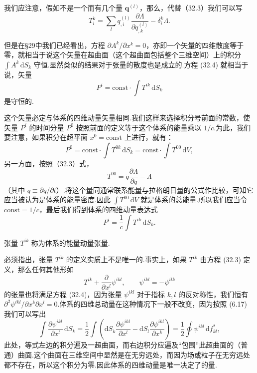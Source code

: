 我们应注意，假如不是一个而有几个量 $\boldsymbol{q}^{(l)}$，那么，代替（32.3）我们可以写
\begin{equation}
  T_i^k=\sum_l q_{,i}^{(l)}
  \frac{\partial\varLambda}{\partial q_{,k}^{(l)}}-\delta_i^k\varLambda.
\end{equation}

但是在§29中我们已经看出，方程 $\partial A^k/\partial x^k=0$，亦即一个矢量的四维散度等于零，就相当于说这个矢量在超曲面（这个超曲面包括整个三维空间）上的积分
$\int A^k\,\mathrm{d}S_k$
守恒.显然类似的结果对于张量的散度也是成立的.方程 (32.4) 就相当于说，矢量
\begin{equation*}
  P^i=\mathrm{const}\cdot\int T^{ik}\,\mathrm{d}S_k
\end{equation*}
是守恒的.

这个矢量必定与体系的四维动量矢量相同.我们这样来选择积分号前面的常数，使矢量 $P^i$ 的时间分量 $P^0$
按照前面的定义等于这个体系的能量乘以 $1/c$.为此，我们要注意，如果积分在超平面
$x^0=\mathrm{const}$ 上进行，就有：
\begin{equation*}
  P^0=\mathrm{const}\cdot\int T^{0k}\,\mathrm{d}S_k
  =\mathrm{const}\cdot\int T^{00}\,\mathrm{d}V,
\end{equation*}
另一方面，按照（32.3）式，
\begin{equation*}
  T^{00}=\dot{q}\frac{\partial\varLambda}{\partial\dot{q}}-\varLambda
\end{equation*}
（其中 $\dot{q}\equiv\partial q/\partial t$）.将这个量同通常联系能量与拉格朗日量的公式作比较，可知它应当被认为是体系的能量密度.因此
$\int T^{00}\,\mathrm{d}V$
就是体系的总能量.所以我们应当令 $\mathrm{const}=1/c$，最后我们得到体系的四维动量表达式
\begin{equation}
  P^i=\frac{1}{c}\int T^{ik}\,\mathrm{d}S_k.
\end{equation}

张量 $T^{ik}$ 称为体系的能量动量张量.

必须指出，张量 $T^{ik}$ 的定义实质上不是唯一的.事实上，如果 $T^{ik}$ 由方程 (32.3)
定义，那么任何其他形如
\begin{equation}
  T^{ik}+\frac{\partial}{\partial x^l}\psi^{ikl},\qquad
  \psi^{ikl}=-\psi^{ilk}
\end{equation}
的张量也将满足方程 (32.4)，因为张量 $\psi^{ikl}$ 对于指标 $k,l$
的反对称性，我们恒有 $\partial^2\psi^{ikl}/\partial x^k\partial x^l=0$.体系的四维总动量在这种情况下一般不改变，因为按照
(6.17) 我们可以写出
\begin{equation*}
  \int\frac{\partial\psi^{ikl}}{\partial x^l}\,\mathrm{d}S_k
  =\frac{1}{2}\int\left(\mathrm{d}S_k\frac{\partial\psi^{ikl}}{\partial x^l}
  -\mathrm{d}S_l\frac{\partial\psi^{ikl}}{\partial x^k}\right)
  =\frac{1}{2}\oint\psi^{ikl}\,\mathrm{d}f_{kl}^{*},
\end{equation*}
此处，等式左边的积分遍及一超曲面，而右边积分应遍及“包围”此超曲面的（普通）曲面.这个曲面在三维空间中显然是在无穷远处，而因为场或粒子在无穷远处都不存在，所以这个积分为零.因此体系的四维动量是唯一决定了的量.

